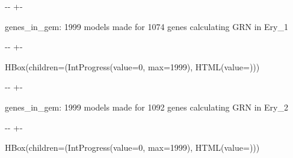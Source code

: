 \documentclass[letterpaper,10pt,english]{sphinxmanual}
\newlength\nbsphinxcodecellspacing
\begin{document}
%
{
\kern-\sphinxverbatimsmallskipamount\kern-\baselineskip
\kern+\FrameHeightAdjust\kern-\fboxrule
\vspace{\nbsphinxcodecellspacing}
%
\begin{sphinxVerbatim}[commandchars=\\\{\}]

genes\_in\_gem: 1999
models made for 1074 genes
calculating GRN in Ery\_1
\end{sphinxVerbatim}
}
\relax

{

\kern-\sphinxverbatimsmallskipamount\kern-\baselineskip
\kern+\FrameHeightAdjust\kern-\fboxrule
\vspace{\nbsphinxcodecellspacing}

%
\begin{sphinxVerbatim}[commandchars=\\\{\}]
HBox(children=(IntProgress(value=0, max=1999), HTML(value=\PYGZsq{}\PYGZsq{})))
\end{sphinxVerbatim}
}



%
{
\kern-\sphinxverbatimsmallskipamount\kern-\baselineskip
\kern+\FrameHeightAdjust\kern-\fboxrule
\vspace{\nbsphinxcodecellspacing}
%
\begin{sphinxVerbatim}[commandchars=\\\{\}]

genes\_in\_gem: 1999
models made for 1092 genes
calculating GRN in Ery\_2
\end{sphinxVerbatim}
}
\relax

{

\kern-\sphinxverbatimsmallskipamount\kern-\baselineskip
\kern+\FrameHeightAdjust\kern-\fboxrule
\vspace{\nbsphinxcodecellspacing}

%
\begin{sphinxVerbatim}[commandchars=\\\{\}]
HBox(children=(IntProgress(value=0, max=1999), HTML(value=\PYGZsq{}\PYGZsq{})))
\end{sphinxVerbatim}
}
\end{document}
